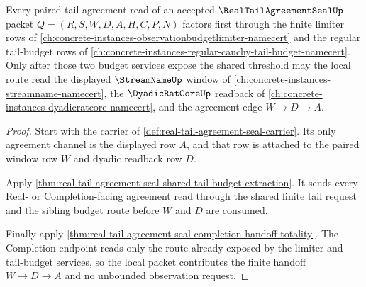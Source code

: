 \begin{theorem}
\label{thm:real-tail-agreement-seal-limiter-budget-factorization}
Every paired tail-agreement read of an accepted $\RealTailAgreementSealUp$ packet $Q=(R,S,W,D,A,H,C,P,N)$ factors first through the finite limiter rows of \autoref{ch:concrete-instances-observationbudgetlimiter-namecert} and the regular tail-budget rows of \autoref{ch:concrete-instances-regular-cauchy-tail-budget-namecert}. Only after those two budget services expose the shared threshold may the local route read the displayed $\StreamNameUp$ window of \autoref{ch:concrete-instances-streamname-namecert}, the $\DyadicRatCoreUp$ readback of \autoref{ch:concrete-instances-dyadicratcore-namecert}, and the agreement edge $W \to D \to A$.
\end{theorem}
\begin{proof}
Start with the carrier of \autoref{def:real-tail-agreement-seal-carrier}. Its only agreement channel is the displayed row $A$, and that row is attached to the paired window row $W$ and dyadic readback row $D$.

Apply \autoref{thm:real-tail-agreement-seal-shared-tail-budget-extraction}. It sends every Real- or Completion-facing agreement read through the shared finite tail request and the sibling budget route before $W$ and $D$ are consumed.

Finally apply \autoref{thm:real-tail-agreement-seal-completion-handoff-totality}. The Completion endpoint reads only the route already exposed by the limiter and tail-budget services, so the local packet contributes the finite handoff $W \to D \to A$ and no unbounded observation request.
\end{proof}


